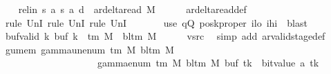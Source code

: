 \begin{isabellebody}
\ \ \isamarkupfalse%
\ rel{\isacharunderscore}{\kern0pt}in{\isacharcolon}{\kern0pt}\ {\isachardoublequoteopen}{\isacharparenleft}{\kern0pt}{\isacharquery}{\kern0pt}s{\isacharcomma}{\kern0pt}\ {\isacharquery}{\kern0pt}a{\isacharcomma}{\kern0pt}\ {\isacharquery}{\kern0pt}s{\isacharprime}{\kern0pt}{\isacharcomma}{\kern0pt}\ {\isacharquery}{\kern0pt}a{\isacharcomma}{\kern0pt}\ {\isacharquery}{\kern0pt}d{\isacharparenright}{\kern0pt}\ {\isasymin}\ ar{\isacharunderscore}{\kern0pt}delta{\isacharunderscore}{\kern0pt}read\ M{\isachardoublequoteclose}\isanewline
\ \ \ \ \isamarkupfalse%
\ ar{\isacharunderscore}{\kern0pt}delta{\isacharunderscore}{\kern0pt}read{\isacharunderscore}{\kern0pt}def\isanewline
\ \ \ \ \isamarkupfalse%
\ {\isacharparenleft}{\kern0pt}rule\ UnI{}{\isacharcomma}{\kern0pt}\ rule\ UnI{}{\isacharcomma}{\kern0pt}\ rule\ UnI{}{\isacharparenright}{\kern0pt}\isanewline
\ \ \ \ \ \ \ {\isacharparenleft}{\kern0pt}use\ qQ\ posk{\isacharunderscore}{\kern0pt}proper\ ilo\ ihi\ \ blast{\isacharparenright}{\kern0pt}\isanewline
\ \ \isamarkupfalse%
\ buf{\isacharunderscore}{\kern0pt}valid{\isacharcolon}{\kern0pt}\ {\isachardoublequoteopen}{\isasymforall}k{\isachardot}{\kern0pt}\ buf\ k\ {\isasymin}\ {\isasymGamma}{\isacharunderscore}{\kern0pt}tm\ M\ {\isasymunion}\ {\isacharbraceleft}{\kern0pt}bl{\isacharunderscore}{\kern0pt}tm\ M{\isacharbraceright}{\kern0pt}{\isachardoublequoteclose}\isanewline
\ \ \ \ \isamarkupfalse%
\ vsrc\ \isamarkupfalse%
\ {\isacharparenleft}{\kern0pt}simp\ add{\isacharcolon}{\kern0pt}\ ar{\isacharunderscore}{\kern0pt}valid{\isacharunderscore}{\kern0pt}stage{\isacharunderscore}{\kern0pt}def{\isacharparenright}{\kern0pt}\isanewline
\ \ \isamarkupfalse%
\ gu{\isacharunderscore}{\kern0pt}mem{\isacharcolon}{\kern0pt}\ {\isachardoublequoteopen}gamma{\isacharunderscore}{\kern0pt}unenum\ {\isacharparenleft}{\kern0pt}{\isasymGamma}{\isacharunderscore}{\kern0pt}tm\ M{\isacharparenright}{\kern0pt}\ {\isacharparenleft}{\kern0pt}bl{\isacharunderscore}{\kern0pt}tm\ M{\isacharparenright}{\kern0pt}\isanewline
\ \ \ \ \ \ \ \ \ \ \ \ \ \ \ \ \ \ {\isacharparenleft}{\kern0pt}{}\ {\isacharasterisk}{\kern0pt}\ gamma{\isacharunderscore}{\kern0pt}enum\ {\isacharparenleft}{\kern0pt}{\isasymGamma}{\isacharunderscore}{\kern0pt}tm\ M{\isacharparenright}{\kern0pt}\ {\isacharparenleft}{\kern0pt}bl{\isacharunderscore}{\kern0pt}tm\ M{\isacharparenright}{\kern0pt}\ {\isacharparenleft}{\kern0pt}buf\ tk{\isacharparenright}{\kern0pt}\ {\isacharplus}{\kern0pt}\ bit{\isacharunderscore}{\kern0pt}value\ {\isacharparenleft}{\kern0pt}{\isacharquery}{\kern0pt}a\ tk{\isacharparenright}{\kern0pt}{\isacharparenright}{\kern0pt}\isanewline

\end{isabellebody}
